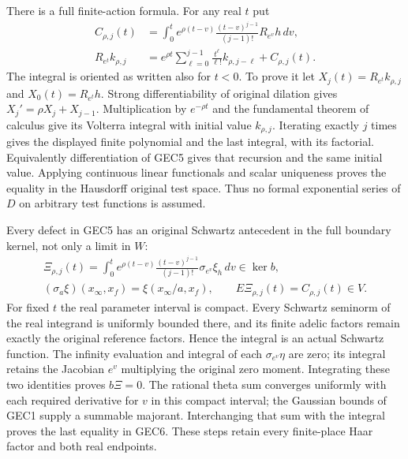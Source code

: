 There is a full finite-action formula. For any real $t$ put
\begin{equation}\tag{GEC5}
 \begin{split}
 C_{\rho,j}(t)
  &=\int_0^t e^{\rho(t-v)}\frac{(t-v)^{j-1}}{(j-1)!}
                      R_{e^v}h\,dv,\\
 R_{e^t}k_{\rho,j}
  &=e^{\rho t}\sum_{\ell=0}^{j-1}\frac{t^\ell}{\ell!}
                   k_{\rho,j-\ell}+C_{\rho,j}(t).
 \end{split}
\end{equation}
The integral is oriented as written also for $t<0$.
To prove it let $X_j(t)=R_{e^t}k_{\rho,j}$ and
$X_0(t)=R_{e^t}h$. Strong differentiability of original
dilation gives $X_j'=\rho X_j+X_{j-1}$. Multiplication
by $e^{-\rho t}$ and the fundamental theorem of calculus
give its Volterra integral with initial value $k_{\rho,j}$.
Iterating exactly $j$ times gives the displayed finite
polynomial and the last integral, with its factorial.
Equivalently differentiation of GEC5 gives that recursion
and the same initial value. Applying continuous linear
functionals and scalar uniqueness proves the equality in
the Hausdorff original test space. Thus no formal exponential
series of $D$ on arbitrary test functions is assumed.

Every defect in GEC5 has an original Schwartz antecedent in
the full boundary kernel, not only a limit in $W$:
\begin{equation}\tag{GEC6}
 \begin{gathered}
 \Xi_{\rho,j}(t)=\int_0^t
      e^{\rho(t-v)}\frac{(t-v)^{j-1}}{(j-1)!}
                   \sigma_{e^v}\xi_h\,dv\in\ker b,\\
 (\sigma_a\xi)(x_\infty,x_f)=\xi(x_\infty/a,x_f),\qquad
 E\Xi_{\rho,j}(t)=C_{\rho,j}(t)\in V.
 \end{gathered}
\end{equation}
For fixed $t$ the real parameter interval is compact. Every
Schwartz seminorm of the real integrand is uniformly bounded
there, and its finite adelic factors remain exactly the
original reference factors. Hence the integral is an actual
Schwartz function. The infinity evaluation and integral of
each $\sigma_{e^v}\eta$ are zero; its integral retains the
Jacobian $e^v$ multiplying the original zero moment. Integrating
these two identities proves $b\Xi=0$. The rational theta sum
converges uniformly with each required derivative for $v$ in
this compact interval; the Gaussian bounds of GEC1 supply a
summable majorant. Interchanging that sum with the integral
proves the last equality in GEC6. These steps retain every
finite-place Haar factor and both real endpoints.

